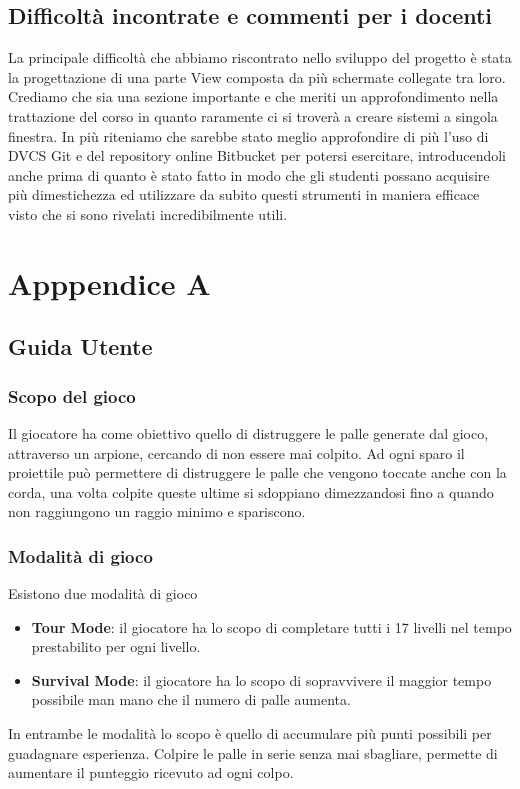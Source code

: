 \documentclass[a4paper,12pt]{report}
\begin{document}
\section{Difficoltà incontrate e commenti per i docenti}
La principale difficoltà che abbiamo riscontrato nello sviluppo del progetto è stata la progettazione di una parte View composta da più schermate collegate tra loro. Crediamo che sia una sezione importante e che meriti un approfondimento nella trattazione del corso in quanto raramente ci si troverà a creare sistemi a singola finestra. 
In più riteniamo che sarebbe stato meglio approfondire di più l'uso di DVCS Git e del repository online Bitbucket per potersi esercitare, introducendoli anche prima di quanto è stato fatto in modo che gli studenti possano acquisire più dimestichezza ed utilizzare da subito questi strumenti in maniera efficace visto che si sono rivelati incredibilmente utili.


\chapter{Apppendice A}
\section{Guida Utente}

\subsection*{Scopo del gioco}
Il giocatore ha come obiettivo quello di distruggere le palle generate dal gioco, attraverso un arpione,  cercando di non essere mai colpito. 
Ad ogni sparo il proiettile può permettere di distruggere le palle che vengono toccate anche con la corda, una volta colpite queste ultime si sdoppiano dimezzandosi fino a quando non raggiungono un raggio minimo e spariscono.

\subsection*{Modalità di gioco}
Esistono due modalità di gioco
\begin{itemize}
	\item \textbf{Tour Mode}: il giocatore ha lo scopo di completare tutti i 17 livelli nel tempo prestabilito per ogni livello.
	\item \textbf{Survival Mode}: il giocatore ha lo scopo di sopravvivere il maggior tempo possibile man mano che il numero di palle aumenta.
\end{itemize}
In entrambe le modalità lo scopo è quello di accumulare più punti possibili per guadagnare esperienza.
Colpire le palle in serie senza mai sbagliare, permette di aumentare il punteggio ricevuto ad ogni colpo.
\end{document}
